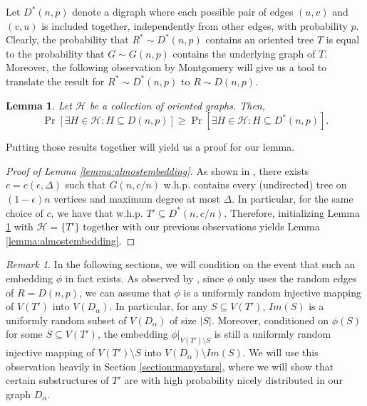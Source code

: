 \documentclass[10pt, a4paper]{article}
\newtheorem{lemma}[theorem]{Lemma}
\theoremstyle{remark}
\newtheorem{remark}[theorem]{Remark}
\begin{document}
Let $D^*(n, p)$ denote a digraph where each possible pair of edges $(u,v)$ and $(v,u)$ is included together, independently from other edges, with probability $p$. 
Clearly, the probability that $R^* \sim D^*(n,p)$ contains an oriented tree $T$ is equal to the probability that $G \sim G(n, p)$ contains the underlying graph of $T$.
Moreover, the following observation by Montgomery will give us a tool to translate the result for $R^* \sim D^*(n, p)$ to $R \sim D(n,p)$.
\begin{lemma}\cite{araujo_oriented_2022,mcdiarmid_general_1983}\label{lemma:coupling}
    Let $\mathcal{H}$ be a collection of oriented graphs. Then,
    \[\Pr[\exists H \in \mathcal{H}: H \subseteq D(n, p)] \geq \Pr[\exists H \in \mathcal{H}: H \subseteq D^*(n, p)].\]
\end{lemma}

Putting those results together will yield us a proof for our lemma.

\begin{proof}[Proof of Lemma \ref{lemma:almostembedding}]

As shown in \cite[Theorem 1.1]{alon_embedding_2007}, there exists $c=c(\epsilon, \Delta)$ such that $G(n, c/n)$ w.h.p. contains every (undirected) tree on $(1-\epsilon)n$ vertices and maximum degree at most $\Delta$.
In particular, for the same choice of $c$, we have that w.h.p. $T' \subseteq D^*(n, c/n)$.
Therefore, initializing Lemma \ref{lemma:coupling} with $\mathcal{H} = \{T' \}$ together with our previous observations yields Lemma \ref{lemma:almostembedding}.

\end{proof}


\begin{remark}\label{remark:uniform}
    In the following sections, we will condition on the event that such an embedding $\phi$ in fact exists.
    As observed by \cite[Remark 3]{krivelevich_bounded-degree_2016}, since $\phi$ only uses the random edges of $R = D(n, p)$, we can assume that $\phi$ is a uniformly random injective mapping of $V(T')$ into $V(D_\alpha)$.
    In particular, for any $S \subseteq V(T')$, $Im(S)$ is a uniformly random subset of $V(D_\alpha)$ of size $|S|$.
    Moreover, conditioned on $\phi(S)$ for some $S \subseteq V(T')$, the embedding $\phi|_{V(T')\setminus S}$ is still a uniformly random injective mapping of $V(T')\setminus S$ into $V(D_\alpha) \setminus Im(S)$.
    We will use this observation heavily in Section \ref{section:manystars}, where we will show that certain substructures of $T'$ are with high probability nicely distributed in our graph $D_\alpha$.
\end{remark}
\end{document}

